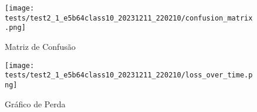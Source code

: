 \begin{figure}[ht]
 \begin{center}
   \texttt{[image: tests/test2\_1\_e5b64class10\_20231211\_220210/confusion\_matrix.png]}
  \caption{Matriz de Confusão}
  \label{fig:fig03}
 \end{center}
\end{figure}

\begin{figure}[ht]
 \begin{center}
   \texttt{[image: tests/test2\_1\_e5b64class10\_20231211\_220210/loss\_over\_time.png]}
  \caption{Gráfico de Perda}
  \label{fig:fig04}
 \end{center}
\end{figure}
